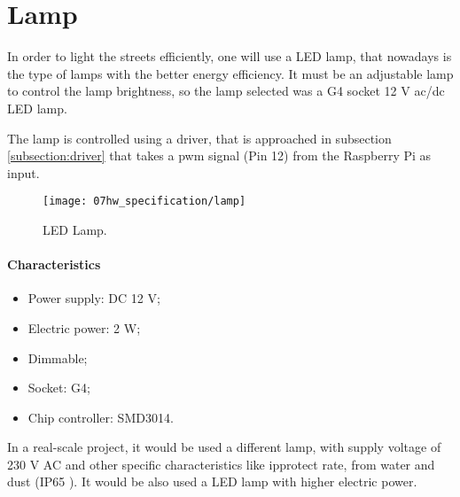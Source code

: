 \section{Lamp}

In order to light the streets efficiently, one will use a LED lamp, that nowadays is the type of lamps with the better energy efficiency. It must be an adjustable lamp to control the lamp brightness, so the lamp selected was a G4 socket 12 V \ac{ac}/\ac{dc} LED lamp.

The lamp is controlled using a driver, that is approached in subsection \ref{subsection:driver} that takes a \ac{pwm} signal (Pin 12) from the Raspberry Pi as input. 

\begin{figure}[H]
	\centering
	\texttt{[image: 07hw\_specification/lamp]}
	\caption{LED Lamp.}
	\label{fig:lamp}
\end{figure}

\paragraph*{Characteristics}
\begin{itemize}
	\item Power supply: DC 12 V;
	\item Electric power: 2 W;
	\item Dimmable;
	\item Socket: G4;   
	\item Chip controller: SMD3014.
\end{itemize}

In a real-scale project, it would be used a different lamp, with supply voltage of 230 V AC and other specific characteristics  like \ac{ipprotect} rate, from water and dust (IP65 \cite{ip65}). It would be also used a LED lamp with higher electric power. 

